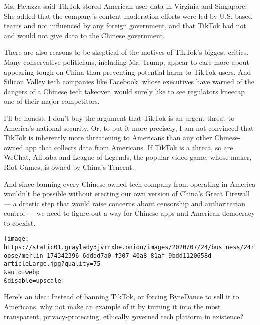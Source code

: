 Ms. Favazza said TikTok stored American user data in Virginia and
Singapore. She added that the company's content moderation efforts were
led by U.S.-based teams and not influenced by any foreign government,
and that TikTok had not and would not give data to the Chinese
government.

There are also reasons to be skeptical of the motives of TikTok's
biggest critics. Many conservative politicians, including Mr. Trump,
appear to care more about appearing tough on China than preventing
potential harm to TikTok users. And Silicon Valley tech companies like
Facebook, whose executives
\href{https://www.cnbc.com/2019/10/17/facebook-ceo-zuckerberg-calls-out-tiktok-censorship-in-china.html}{have
warned} of the dangers of a Chinese tech takeover, would surely like to
see regulators kneecap one of their major competitors.

I'll be honest: I don't buy the argument that TikTok is an urgent threat
to America's national security. Or, to put it more precisely, I am not
convinced that TikTok is inherently more threatening to Americans than
any other Chinese-owned app that collects data from Americans. If TikTok
is a threat, so are WeChat, Alibaba and League of Legends, the popular
video game, whose maker, Riot Games, is owned by China's Tencent.

And since banning every Chinese-owned tech company from operating in
America wouldn't be possible without erecting our own version of China's
Great Firewall --- a drastic step that would raise concerns about
censorship and authoritarian control --- we need to figure out a way for
Chinese apps and American democracy to coexist.

\texttt{[image: https://static01.graylady3jvrrxbe.onion/images/2020/07/24/business/24roose/merlin\_174342396\_6dddd7a0-f307-40a8-81af-9bdd1120658d-articleLarge.jpg?quality=75\\\&auto=webp\\\&disable=upscale]}

Here's an idea: Instead of banning TikTok, or forcing ByteDance to sell
it to Americans, why not make an example of it by turning it into the
most transparent, privacy-protecting, ethically governed tech platform
in existence?

